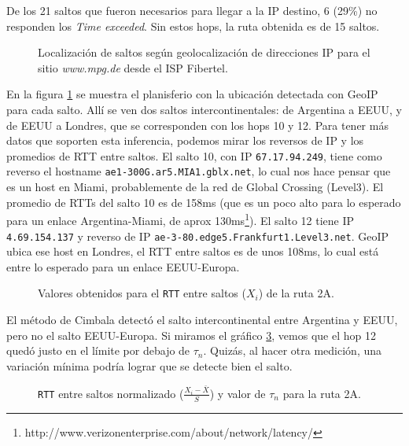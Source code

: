 De los 21 saltos que fueron necesarios para llegar a la IP destino, 6 (29\%) no responden los \emph{Time exceeded}. Sin estos hops, la ruta obtenida es de 15 saltos.

\begin{figure}[H]
    \caption{Localización de saltos según geolocalización de direcciones IP para
    el sitio \emph{www.mpg.de} desde el ISP Fibertel.}
    \label{res:escb1:map}
\end{figure}

En la figura \ref{res:escb1:map} se muestra el planisferio con la ubicación detectada con GeoIP para cada salto. Allí se ven dos saltos intercontinentales: de Argentina a EEUU, y de EEUU a Londres, que se corresponden con los hops 10 y 12. Para tener más datos que soporten esta inferencia, podemos mirar los reversos de IP y los promedios de RTT entre saltos. El salto 10, con IP \texttt{67.17.94.249}, tiene como reverso el hostname \texttt{ae1-300G.ar5.MIA1.gblx.net}, lo cual nos hace pensar que es un host en Miami, probablemente de la red de Global Crossing (Level3). El promedio de RTTs del salto 10 es de 158ms (que es un poco alto para lo esperado para un enlace Argentina-Miami, de aprox 130ms\footnote{http://www.verizonenterprise.com/about/network/latency/}). El salto 12 tiene IP \texttt{4.69.154.137} y reverso de IP \texttt{ae-3-80.edge5.Frankfurt1.Level3.net}. GeoIP ubica ese host en Londres, el RTT entre saltos es de unos 108ms, lo cual está entre lo esperado para un enlace EEUU-Europa.

\begin{figure}[H]
    \caption{Valores obtenidos para el \texttt{RTT} entre saltos ($X_i$) de la ruta 2A.}
    \label{res:escb1:rtt}
\end{figure}

El método de Cimbala detectó el salto intercontinental entre Argentina y EEUU, pero no el salto EEUU-Europa. Si miramos el gráfico \ref{res:escb1:rttnorm}, vemos que el hop 12 quedó justo en el límite por debajo de $\tau_n$. Quizás, al hacer otra medición, una variación mínima podría lograr que se detecte bien el salto.

\begin{figure}[H]
    \caption{\texttt{RTT} entre saltos normalizado ($\frac{X_i-\bar{X}}{S}$)
    y valor de $\tau_n$ para la ruta 2A.}
    \label{res:escb1:rttnorm}
\end{figure}

